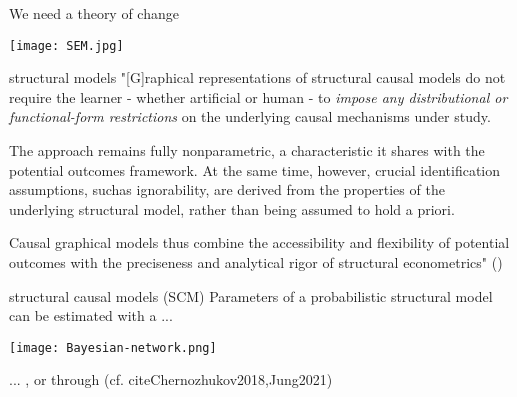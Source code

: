 \documentclass[aspectratio=169]{beamer}
\begin{document}
		\begin{frame}{We need a theory of change}
			\begin{center}
					\texttt{[image: SEM.jpg]}
			\end{center}
		\end{frame}

		\begin{frame}{structural models}
			"[G]raphical representations of structural causal models do not require the learner - whether artificial or human - to \textit{impose any distributional or functional-form restrictions} on the underlying causal mechanisms under study. \\ \vspace*{.1cm}

			The approach remains fully nonparametric, a characteristic it shares with the potential outcomes framework.  At the same time,  however,  crucial identification assumptions,  suchas ignorability, are derived from the properties of the underlying structural model, rather than being assumed to hold a priori.  \\ \vspace*{.1cm}

			Causal graphical models thus combine  the  accessibility  and  flexibility  of  potential  outcomes  with  the  preciseness and  analytical  rigor  of  structural  econometrics" (\cite{Hunermund2021})
		\end{frame}

		\begin{frame}{structural causal models (SCM)}
			Parameters of a probabilistic structural model can be estimated with a \href{https://github.com/stan-dev/rstan/wiki/RStan-Getting-Started}{\underline{}} \href{https://www.bnlearn.com/}{\underline{}} \href{https://github.com/paul-buerkner/brms}{\underline{}} ...
			\begin{center}
				\texttt{[image: Bayesian-network.png]}
			\end{center}
			... \href{https://cran.r-project.org/web/packages/cSEM/vignettes/cSEM.html}{\underline{}}, or through \href{https://github.com/VC2015/DMLonGitHub}{\underline{}} (cf. cite{Chernozhukov2018,Jung2021})
		\end{frame}
\end{document}
